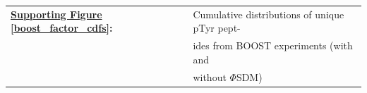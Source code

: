 \documentclass[journal=jprobs,manuscript=article]{achemso}
\renewcommand{\tablename}{Supporting Table}     %
\begin{document}
\begin{table}[h!]
\begin{tabular}{ll}
        \textbf{\hyperref[boost_factor_cdfs]{Supporting Figure} \ref{boost_factor_cdfs}:} & Cumulative distributions of unique pTyr pept- \\
                                                                                                                                                    & ides from BOOST experiments (with and \\
                                                                                                                                       & without $\Phi$SDM)\\

    \end{tabular}
\end{table}

\newpage




\setcounter{table}{0}
\renewcommand{\tablename}{Supplemental Folder}




\clearpage
\end{document}
